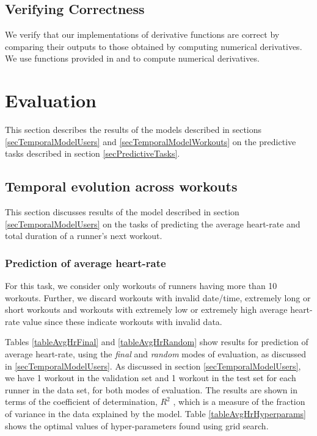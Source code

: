 \documentclass{acm_proc_article-sp}
\begin{document}
\subsection{Verifying Correctness}

We verify that our implementations of derivative functions are correct by comparing their outputs to those obtained by computing numerical derivatives. We use functions provided in \cite{scipy} and \cite{dlib} to compute numerical derivatives.

\section{Evaluation}
\label{secEvaluation}
This section describes the results of the models described in sections \ref{secTemporalModelUsers} and \ref{secTemporalModelWorkouts} on the predictive tasks described in section \ref{secPredictiveTasks}. 

\subsection{Temporal evolution across workouts}
This section discusses results of the model described in section \ref{secTemporalModelUsers} on the tasks of predicting the average heart-rate and total duration of a runner's next workout.

\subsubsection{Prediction of average heart-rate}

For this task, we consider only workouts of runners having more than 10 workouts. Further, we discard workouts with invalid date/time, extremely long or short workouts and workouts with extremely low or extremely high average heart-rate value since these indicate workouts with invalid data.

Tables \ref{tableAvgHrFinal} and \ref{tableAvgHrRandom} show results for prediction of average heart-rate, using the  \emph{final} and \emph{random} modes of evaluation, as discussed in \ref{secTemporalModelUsers}. As discussed in section \ref{secTemporalModelUsers}, we have 1 workout in the validation set and 1 workout in the test set for each runner in the data set, for both modes of evaluation. The results are shown in terms of the coefficient of determination, $R^2$ \cite{r2Wiki}, which is a measure of the fraction of variance in the data explained by the model. Table \ref{tableAvgHrHyperparams} shows the optimal values of hyper-parameters found using grid search.
\end{document}
